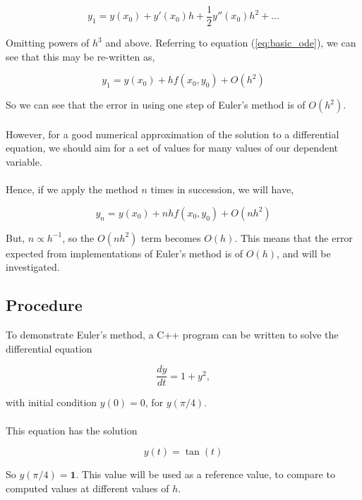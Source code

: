 \documentclass[pdf,color]{UoBnote}
\begin{document}
	\begin{equation}
	y_1 = y(x_0) + y'(x_0)h + \frac{1}{2}y''(x_0)h^2 + ...
	\end{equation}
	
	Omitting powers of $h^3$ and above. Referring to equation (\ref{eq:basic_ode}), we can see that this may be re-written as,
	
	\begin{equation}
	y_1 = y(x_0) + hf(x_0,y_0) + O(h^2)
	\end{equation}
	
	So we can see that the error in using one step of Euler's method is of $O(h^2)$.\\\\
	However, for a good numerical approximation of the solution to a differential equation, we should aim for a set of values for many values of our dependent variable.\\\\
	Hence, if we apply the method $n$ times in succession, we will have,
	
	\begin{equation}
	y_n = y(x_0) + nhf(x_0,y_0) + O(nh^2)
	\end{equation}
	
	But, $n \propto h^{-1}$, so the $O(nh^2)$ term becomes $O(h)$. This means that the error expected from implementations of Euler's method is of $O(h)$, and will be investigated.
	\subsection{Procedure}
	To demonstrate Euler's method, a C++ program can be written to solve the differential equation
	
	\begin{equation}
	\frac{dy}{dt} = 1 + y^2 ,
	\end{equation}
				
	with initial condition $y(0) = 0$, for $y(\pi/4)$.\\\\
	This equation has the solution
	
	\begin{equation}
	y(t) = \tan(t)
	\end{equation}
	
	So $y(\pi/4) = \mathbf{1}$. This value will be used as a reference value, to compare to computed values at different values  of $h$.\\\\
	
\end{document}
